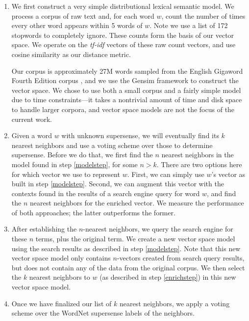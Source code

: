 \documentclass{article}
\begin{document}
\begin{enumerate}
\item\label{modelstep}
We first construct a very simple distributional lexical semantic model.
We process a corpus of raw text and, for each word $w$, count the number of times every other word appears within 5 words of $w$.
Note we use a list of 172 stopwords to completely ignore.
These counts form the basis of our vector space.
We operate on the {\it tf-idf} vectors of these raw count vectors, and use cosine similarity as our distance metric.

Our corpus is approximately 27M words sampled from the English Gigaword Fourth Edition corpus \cite{gigaword}, and we use the Gensim framework \cite{gensim} to construct the vector space.
We chose to use both a small corpus and a fairly simple model due to time constraints---it takes a nontrivial amount of time and disk space to handle larger corpora, and vector space models are not the focus of the current work.

\item \label{enrichstep}
Given a word $w$ with unknown supersense, we will eventually find its $k$ nearest neighbors and use a voting scheme over those to determine supersense.
Before we do that, we first find the $n$ nearest neighbors in the model found in step \ref{modelstep}, for some $n > k$.
There are two options here for which vector we use to represent $w$.
First, we can simply use $w$'s vector as built in step \ref{modelstep}.
Second, we can augment this vector with the contexts found in the results of a search engine query for word $w$, and find the $n$ nearest neighbors for the enriched vector.
We measure the performance of both approaches; the latter outperforms the former.

\item \label{refinestep}
After establishing the $n$-nearest neighbors, we query the search engine for these $n$ terms, plus the original term. 
We create a new vector space model using the search results as described in step \ref{modelstep}. 
Note that this new vector space model only contains $n$-vectors created from search query results, but does not contain any of the data from the original corpus. 
We then select the $k$ nearest neighbors to $w$ (as described in step \ref{enrichstep}) in this new vector space model.

\item
\label{item:voting}
Once we have finalized our list of $k$ nearest neighbors, we apply a voting scheme over the WordNet supersense labels of the neighbors.


\end{enumerate}
\end{document}
